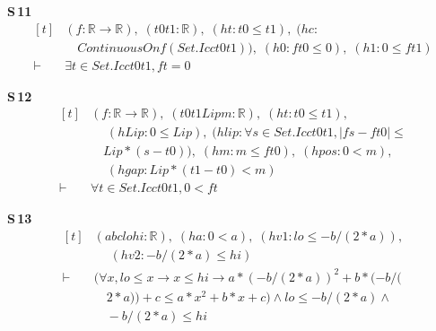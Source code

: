 \noindent\textbf{S\,11}\quad{}
{\footnotesize\[ \begin{aligned}[t]
&(\mathit{f} : \mathbb{R} \to \mathbb{R} ),\; (\mathit{t0} \mathit{t1} : \mathbb{R} ),\; (\mathit{ht} : \mathit{t0} \leq \mathit{t1}),\; (\mathit{hc} :\\
&\quad \mathit{ContinuousOn} \mathit{f} (\mathit{Set}.\mathit{Icc} \mathit{t0} \mathit{t1})),\; (\mathit{h0} : \mathit{f} \mathit{t0} \leq 0),\; (\mathit{h1} : 0 \leq \mathit{f} \mathit{t1})\\
\vdash\;&\exists \mathit{t} \in \mathit{Set}.\mathit{Icc} \mathit{t0} \mathit{t1}, \mathit{f} \mathit{t} = 0
\end{aligned} \]}

\noindent\textbf{S\,12}\quad{}
{\footnotesize\[ \begin{aligned}[t]
&(\mathit{f} : \mathbb{R} \to \mathbb{R} ),\; (\mathit{t0} \mathit{t1} \mathit{Lip} \mathit{m} : \mathbb{R} ),\; (\mathit{ht} : \mathit{t0} \leq \mathit{t1}),\\
&\quad \; (\mathit{hLip} : 0 \leq \mathit{Lip}),\; (\mathit{hlip} : \forall \mathit{s} \in \mathit{Set}.\mathit{Icc} \mathit{t0} \mathit{t1}, |\mathit{f} \mathit{s} - \mathit{f} \mathit{t0}| \leq\\
&\quad \mathit{Lip} * (\mathit{s} - \mathit{t0})),\; (\mathit{hm} : \mathit{m} \leq \mathit{f} \mathit{t0}),\; (\mathit{hpos} : 0 < \mathit{m}),\\
&\quad \; (\mathit{hgap} : \mathit{Lip} * (\mathit{t1} - \mathit{t0}) < \mathit{m})\\
\vdash\;&\forall \mathit{t} \in \mathit{Set}.\mathit{Icc} \mathit{t0} \mathit{t1}, 0 < \mathit{f} \mathit{t}
\end{aligned} \]}

\noindent\textbf{S\,13}\quad{}
{\footnotesize\[ \begin{aligned}[t]
&(\mathit{a} \mathit{b} \mathit{c} \mathit{lo} \mathit{hi} : \mathbb{R} ),\; (\mathit{ha} : 0 < \mathit{a}),\; (\mathit{hv1} : \mathit{lo} \leq -\mathit{b} / (2 * \mathit{a})),\\
&\quad \; (\mathit{hv2} : -\mathit{b} / (2 * \mathit{a}) \leq \mathit{hi})\\
\vdash\;&(\forall \mathit{x}, \mathit{lo} \leq \mathit{x} \to \mathit{x} \leq \mathit{hi} \to \mathit{a} * (-\mathit{b} / (2 * \mathit{a})) ^{2} + \mathit{b} * (-\mathit{b} / (\\
&\quad 2 * \mathit{a})) + \mathit{c} \leq \mathit{a} * \mathit{x} ^{2} + \mathit{b} * \mathit{x} + \mathit{c}) \wedge \mathit{lo} \leq -\mathit{b} / (2 * \mathit{a}) \wedge\\
&\quad -\mathit{b} / (2 * \mathit{a}) \leq \mathit{hi}
\end{aligned} \]}


